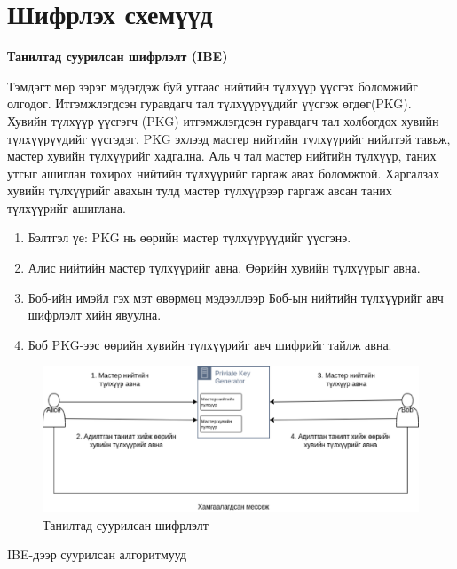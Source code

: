 
\section{Шифрлэх схемүүд}

\textbf{Танилтад суурилсан шифрлэлт (IBE)} 

Тэмдэгт мөр зэрэг мэдэгдэж буй утгаас нийтийн түлхүүр үүсгэх боломжийг олгодог. Итгэмжлэгдсэн гуравдагч тал түлхүүрүүдийг үүсгэж өгдөг(PKG). 
Хувийн түлхүүр үүсгэгч (PKG) итгэмжлэгдсэн гуравдагч тал холбогдох хувийн түлхүүрүүдийг үүсгэдэг. PKG эхлээд мастер нийтийн түлхүүрийг нийлтэй тавьж, мастер хувийн түлхүүрийг хадгална. Аль ч тал мастер нийтийн түлхүүр, таних утгыг ашиглан тохирох нийтийн түлхүүрийг гаргаж авах боломжтой. Харгалзах хувийн түлхүүрийг авахын тулд мастер түлхүүрээр гаргаж авсан таних түлхүүрийг ашиглана. \cite{WikiIDE}

\begin{enumerate}
    \item Бэлтгэл үе: PKG нь өөрийн мастер түлхүүрүүдийг үүсгэнэ.
    \item Алис нийтийн мастер түлхүүрийг авна. Өөрийн хувийн түлхүүрыг авна.
    \item Боб-ийн имэйл гэх мэт өвөрмөц мэдээллээр Боб-ын нийтийн түлхүүрийг авч шифрлэлт хийн явуулна.
    \item Боб PKG-ээс өөрийн хувийн түлхүүрийг авч шифрийг тайлж авна.
\end{enumerate}

\begin{figure}[ht]
\centering
\includegraphics[scale=0.6]{Figures/IBE.eps}
\caption[IBE]{Танилтад суурилсан шифрлэлт}
\label{fig:IBE}
\end{figure}

IBE-дээр суурилсан алгоритмууд


